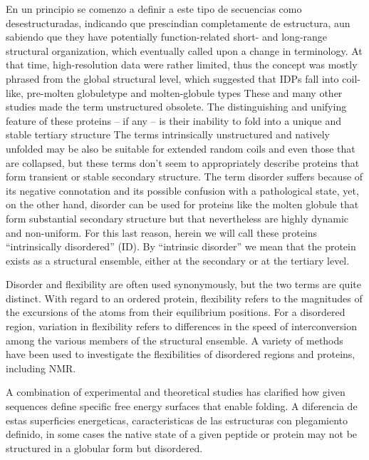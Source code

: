 En un principio se comenzo a definir a este tipo de secuencias como desestructuradas, indicando que prescindian completamente de estructura, aun sabiendo que they have potentially function-related
short- and long-range structural organization, which eventually called upon a change in terminology.
At that time, high-resolution data were rather limited, thus the concept was mostly phrased from the global structural level, which suggested that IDPs fall into coil-like, pre-molten globuletype and molten-globule types
These and many other studies made the term unstructured obsolete. 
The distinguishing and unifying feature of these proteins – if any – is their inability to fold into a unique and stable tertiary structure
The terms intrinsically unstructured and natively unfolded may be also be suitable for extended random coils and even those that are collapsed, but these terms don't seem to appropriately describe proteins that form transient or
stable secondary structure. The term disorder suffers because of its negative connotation and its possible confusion with a pathological state, yet, on the other hand, disorder can be used for proteins like the molten globule that form substantial secondary structure but that
nevertheless are highly dynamic and non-uniform. For this last reason, herein we will call these proteins “intrinsically disordered” (ID).
By “intrinsic disorder” we mean that the protein exists as a structural ensemble, either at the secondary or at the tertiary level.

Disorder and flexibility are often used synonymously, but the two terms are quite distinct\cite{radivojac2004protein}. With regard to an ordered protein, flexibility refers to the magnitudes of the excursions of the atoms from their equilibrium positions.
For a disordered region, variation in flexibility refers to differences in the speed of interconversion among the various members of the structural ensemble. A variety of methods have been
used to investigate the flexibilities of disordered regions and proteins, including NMR.


A combination of experimental and theoretical studies has clarified how given sequences define specific free energy surfaces that enable folding.
A diferencia de estas superficies energeticas, caracteristicas de las estructuras con plegamiento definido, in some cases the native state of a given peptide or protein may not be structured in a globular form but disordered.

